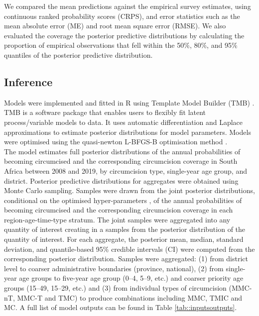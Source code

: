 \documentclass{article}
\begin{document}
\begin{appendix}
We compared the mean predictions against the empirical survey estimates, using continuous ranked probability scores (CRPS), and error statistics such as the mean absolute error (ME) and root mean square error (RMSE). We also evaluated the coverage the posterior predictive distributions by calculating the proportion of empirical observations that fell within the 50\%, 80\%, and 95\% quantiles of the posterior predictive distribution. 


\subsection{Inference}


\noindent Models were implemented and fitted in R \cite{rcore} using Template Model Builder (TMB) \cite{kristensen2016tmb}. TMB is a software package that enables users to flexibly fit latent process/variable models to data. It uses automatic differentiation and Laplace approximations to estimate posterior distributions for model parameters. Models were optimised using the quasi-newton L-BFGS-B optimisation method \cite{byrd1995limited}.\\

\noindent The model estimates full posterior distributions of the annual probabilities of becoming circumcised and the corresponding circumcision coverage in South Africa between 2008 and 2019, by circumcision type, single-year age group, and district. Posterior predictive distributions for aggregates were obtained using Monte Carlo sampling. Samples were drawn from the joint posterior distributions, conditional on the optimised hyper-parameters \cite{eaton2021naomi}, of the annual probabilities of becoming circumcised and the corresponding circumcision coverage in each region-age-time-type stratum. The joint samples were aggregated into any quantity of interest creating in a samples from the posterior distribution of the quantity of interest. For each aggregate, the posterior mean, median, standard deviation, and quantile-based 95\% credible intervals (CI) were computed from the corresponding posterior distribution. Samples were aggregated: (1) from district level to coarser administrative boundaries (province, national), (2) from single-year age groups to five-year age group (0--4, 5--9, etc.) and coarser priority age groups (15--49, 15--29, etc.) and (3) from individual types of circumcision (MMC-nT, MMC-T and TMC) to produce combinations including MMC, TMIC and MC. A full list of model outputs can be found in Table \ref{tab::inputsoutputs}.



\end{appendix}
\end{document}
